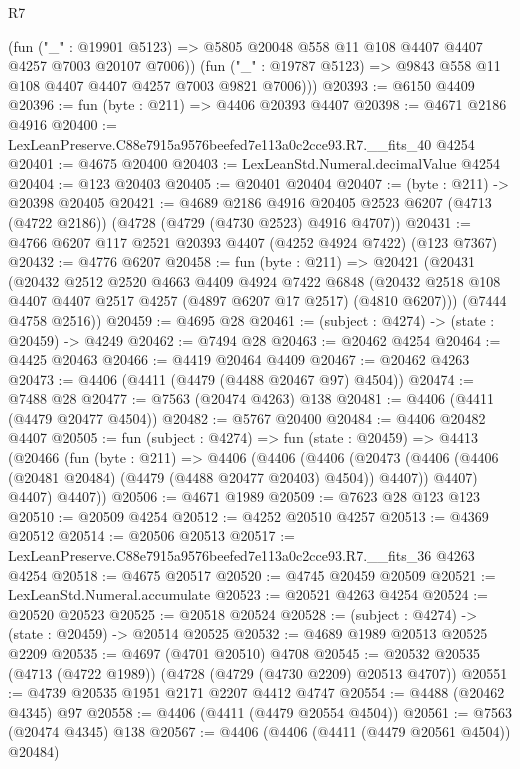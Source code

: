 \begin{lexlean}{R7}
\begin{coremodule}
          (fun ("_" : @19901 @5123) =>
          @5805 @20048 @558 @11 @108 @4407 @4407 @4257 @7003 @20107 @7006))
        (fun ("_" : @19787 @5123) => @9843 @558 @11 @108 @4407 @4407 @4257 @7003 @9821 @7006)))
@20393 := @6150 @4409
@20396 := fun (byte : @211) => @4406 @20393 @4407
@20398 := @4671 @2186 @4916
@20400 := LexLeanPreserve.C88e7915a9576beefed7e113a0c2cce93.R7.__fits_40 @4254
@20401 := @4675 @20400
@20403 := LexLeanStd.Numeral.decimalValue @4254
@20404 := @123 @20403
@20405 := @20401 @20404
@20407 := (byte : @211) -> @20398 @20405
@20421 := @4689
    @2186
    @4916
    @20405
    @2523
    @6207
    (@4713 (@4722 @2186))
    (@4728 (@4729 (@4730 @2523) @4916 @4707))
@20431 := @4766 @6207 @117 @2521 @20393 @4407 (@4252 @4924 @7422) (@123 @7367)
@20432 := @4776 @6207
@20458 := fun (byte : @211) =>
  @20421
    (@20431
      (@20432
        @2512
        @2520
        @4663
        @4409
        @4924
        @7422
        @6848
        (@20432 @2518 @108 @4407 @4407 @2517 @4257 (@4897 @6207 @17 @2517) (@4810 @6207)))
      (@7444 @4758 @2516))
@20459 := @4695 @28
@20461 := (subject : @4274) -> (state : @20459) -> @4249
@20462 := @7494 @28
@20463 := @20462 @4254
@20464 := @4425 @20463
@20466 := @4419 @20464 @4409
@20467 := @20462 @4263
@20473 := @4406 (@4411 (@4479 (@4488 @20467 @97) @4504))
@20474 := @7488 @28
@20477 := @7563 (@20474 @4263) @138
@20481 := @4406 (@4411 (@4479 @20477 @4504))
@20482 := @5767 @20400
@20484 := @4406 @20482 @4407
@20505 := fun (subject : @4274) =>
  fun (state : @20459) =>
  @4413
    (@20466
      (fun (byte : @211) =>
      @4406
        (@4406
          (@4406
            (@20473 (@4406 (@4406 (@20481 @20484) (@4479 (@4488 @20477 @20403) @4504)) @4407))
            @4407)
          @4407)
        @4407))
@20506 := @4671 @1989
@20509 := @7623 @28 @123 @123
@20510 := @20509 @4254
@20512 := @4252 @20510 @4257
@20513 := @4369 @20512
@20514 := @20506 @20513
@20517 := LexLeanPreserve.C88e7915a9576beefed7e113a0c2cce93.R7.__fits_36 @4263 @4254
@20518 := @4675 @20517
@20520 := @4745 @20459 @20509
@20521 := LexLeanStd.Numeral.accumulate
@20523 := @20521 @4263 @4254
@20524 := @20520 @20523
@20525 := @20518 @20524
@20528 := (subject : @4274) -> (state : @20459) -> @20514 @20525
@20532 := @4689 @1989 @20513 @20525 @2209
@20535 := @4697 (@4701 @20510) @4708
@20545 := @20532 @20535 (@4713 (@4722 @1989)) (@4728 (@4729 (@4730 @2209) @20513 @4707))
@20551 := @4739 @20535 @1951 @2171 @2207 @4412 @4747
@20554 := @4488 (@20462 @4345) @97
@20558 := @4406 (@4411 (@4479 @20554 @4504))
@20561 := @7563 (@20474 @4345) @138
@20567 := @4406 (@4406 (@4411 (@4479 @20561 @4504)) @20484)

\end{coremodule}
\end{lexlean}
